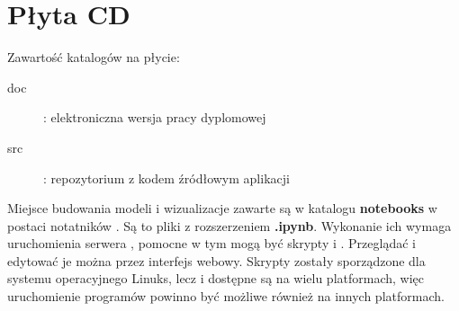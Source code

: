 \chapter{Płyta CD}\label{app:plyta}

\begin{figure}[htb]
\makebox[\textwidth]{\framebox[12.8cm]{\rule{0pt}{12.8cm}}}
\end{figure}
\pagebreak

Zawartość katalogów na płycie:
\begin{description}
    \item[doc] : elektroniczna wersja pracy dyplomowej
    \item[src] : repozytorium z kodem źródłowym aplikacji
\end{description}

Miejsce budowania modeli i wizualizacje zawarte są w katalogu \textbf{notebooks} w postaci notatników . Są to pliki z rozszerzeniem \textbf{.ipynb}. Wykonanie ich wymaga uruchomienia serwera , pomocne w tym mogą być skrypty  i . Przeglądać i edytować je można przez interfejs webowy. Skrypty zostały sporządzone dla systemu operacyjnego Linuks, lecz  i  dostępne są na wielu platformach, więc uruchomienie programów powinno być możliwe również na innych platformach.

